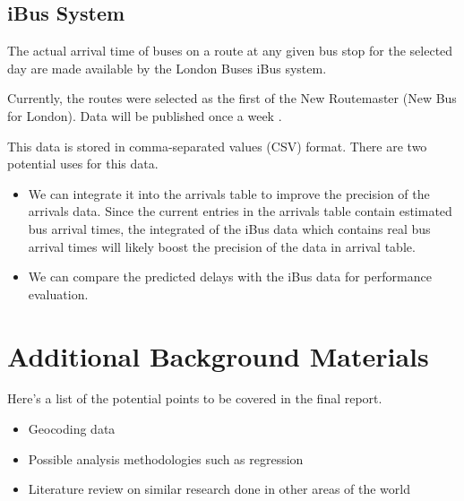 \subsection{iBus System}
The actual arrival time of buses on a route at any given bus stop for the selected day are made available by the London Buses iBus system.

Currently, the routes were selected as the first of the New Routemaster (New Bus for London). Data will be published once a week \cite{buses_performance_data}.

This data is stored in comma-separated values (CSV) format. There are two potential uses for this data.
\begin{itemize}
	\item We can integrate it into the arrivals table to improve the precision of the arrivals data. Since the current entries in the arrivals table contain estimated bus arrival times, the integrated of the iBus data which contains real bus arrival times will likely boost the precision of the data in arrival table.
	\item We can compare the predicted delays with the iBus data for performance evaluation.
\end{itemize}

\section{Additional Background Materials}
Here's a list of the potential points to be covered in the final report.

\begin{itemize}
	\item Geocoding data
    \item Possible analysis methodologies such as regression
    \item Literature review on similar research done in other areas of the world
\end{itemize}




